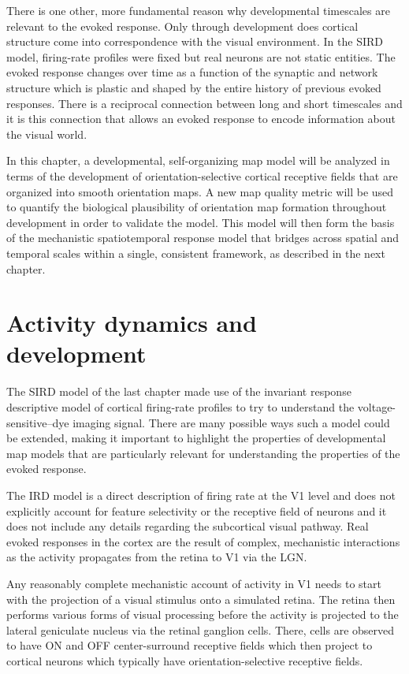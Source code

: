 \documentclass[phd,ianc,twoside]{infthesis}
\begin{document}
There is one other, more fundamental reason why developmental timescales
are relevant to the evoked response. Only through development does
cortical structure come into correspondence with the visual
environment. In the SIRD model, firing-rate profiles were fixed but real
neurons are not static entities. The evoked response changes over time
as a function of the synaptic and network structure which is plastic and
shaped by the entire history of previous evoked responses. There is a
reciprocal connection between long and short timescales and it is this
connection that allows an evoked response to encode information about
the visual world.

In this chapter, a developmental, self-organizing map model will be
analyzed in terms of the development of orientation-selective cortical
receptive fields that are organized into smooth orientation maps. A new
map quality metric will be used to quantify the biological plausibility
of orientation map formation throughout development in order to validate
the model. This model will then form the basis of the mechanistic
spatiotemporal response model that bridges across spatial and temporal
scales within a single, consistent framework, as described in the next
chapter.

\section{Activity dynamics and development}

The SIRD model of the last chapter made use of the invariant response
descriptive model of cortical firing-rate profiles to try to understand
the voltage-sensitive--dye imaging signal. There are many possible ways
such a model could be extended, making it important to highlight the
properties of developmental map models that are particularly relevant
for understanding the properties of the evoked response.

The IRD model is a direct description of firing rate at the V1 level and
does not explicitly account for feature selectivity or the receptive
field of neurons and it does not include any details regarding the
subcortical visual pathway. Real evoked responses in the cortex are the
result of complex, mechanistic interactions as the activity propagates
from the retina to V1 via the LGN.

Any reasonably complete mechanistic account of activity in V1 needs to
start with the projection of a visual stimulus onto a simulated retina.
The retina then performs various forms of visual processing before the
activity is projected to the lateral geniculate nucleus via the retinal
ganglion cells. There, cells are observed to have ON and OFF
center-surround receptive fields which then project to cortical neurons
which typically have orientation-selective receptive fields.
\end{document}
